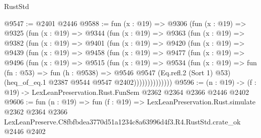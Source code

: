 \begin{lexlean}{RustStd}
\begin{coremodule}
@9547 := @2401 @2446
@9588 := fun (x : @19) =>
  @9306
    (fun (x : @19) =>
    @9325
      (fun (x : @19) =>
      @9344
        (fun (x : @19) =>
        @9363
          (fun (x : @19) =>
          @9382
            (fun (x : @19) =>
            @9401
              (fun (x : @19) =>
              @9420
                (fun (x : @19) =>
                @9439
                  (fun (x : @19) =>
                  @9458
                    (fun (x : @19) =>
                    @9477
                      (fun (x : @19) =>
                      @9496
                        (fun (x : @19) =>
                        @9515
                          (fun (x : @19) =>
                          @9534
                            (fun (x : @19) =>
                            fun (fn : @53) =>
                            fun (h : @9538) =>
                            @9546
                              @9547
                              (Eq.refl.{2} (Sort 1) @53)
                              (heq_of_eq.{1} @2387 @9544 @9547 @2402))))))))))))))
@9596 := (n : @19) -> (f : @19) -> LexLeanPreservation.Rust.FunSem @2362 @2364 @2366 @2446 @2402
@9606 := fun (n : @19) =>
  fun (f : @19) =>
  LexLeanPreservation.Rust.simulate
    @2362
    @2364
    @2366
    LexLeanPreserve.C8fbfbdea3770d51a1234c8a63996d4f3.R4.RustStd.crate_ok
    @2446
    @2402
\end{coremodule}
\end{lexlean}
